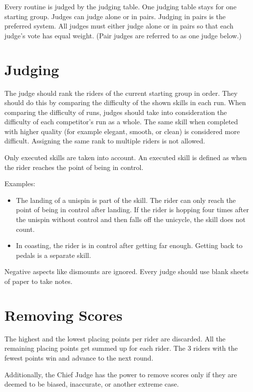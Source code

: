 Every routine is judged by the judging table.
One judging table stays for one starting group.
Judges can judge alone or in pairs.
Judging in pairs is the preferred system.
All judges must either judge alone or in pairs so that each judge's vote has equal weight.
(Pair judges are referred to as one judge below.)

\section{Judging}

The judge should rank the riders of the current starting group in order.
They should do this by comparing the difficulty of the shown skills in each run.
When comparing the difficulty of runs, judges should take into consideration the difficulty of each competitor's run as a whole.
The same skill when completed with higher quality (for example elegant, smooth, or clean) is considered more difficult.
Assigning the same rank to multiple riders is not allowed.

Only executed skills are taken into account.
An executed skill is defined as when the rider reaches the point of being in control.

Examples:
\begin{itemize}
\item The landing of a unispin is part of the skill.
The rider can only reach the point of being in control after landing.
If the rider is hopping four times after the unispin without control and then falls off the unicycle, the skill does not count.
\item In coasting, the rider is in control after getting far enough.
Getting back to pedals is a separate skill.
\end{itemize}

Negative aspects like dismounts are ignored.
Every judge should use blank sheets of paper to take notes.

\section{Removing Scores}

The highest and the lowest placing points per rider are discarded.
All the remaining placing points get summed up for each rider.
The 3 riders with the fewest points win and advance to the next round.

Additionally, the Chief Judge has the power to remove scores only if they are deemed to be biased, inaccurate, or another extreme case.
